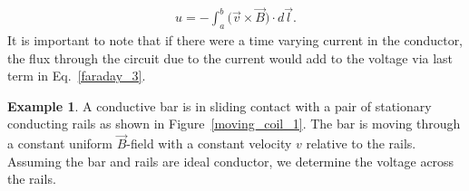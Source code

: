 \documentclass[11pt,a4paper,oneside]{book}
\numberwithin{equation}{section}
\theoremstyle{it}
\theoremstyle{definition}
\newtheorem{example}{Example}[section]
\begin{document}
 \begin{equation}\label{faraday_4}
	\begin{aligned}
		u=-\int_{a}^{b}\big(\vec{v}\times\vec{B}\big)\cdot d\vec{l}.
	\end{aligned}
\end{equation} 
It is important to note that if there were a time varying current in the conductor, the flux through the circuit due to the current would add to the voltage via last term in Eq.~\eqref{faraday_3}.
\begin{example}
A conductive bar is in sliding contact with a pair of stationary conducting rails as shown in Figure~\ref{moving_coil_1}. The bar is moving through a constant uniform $\vec{B}$-field with a constant velocity $v$ relative to the rails. Assuming the bar and rails are ideal conductor, we determine the voltage across the rails.


\end{example}
\end{document}
